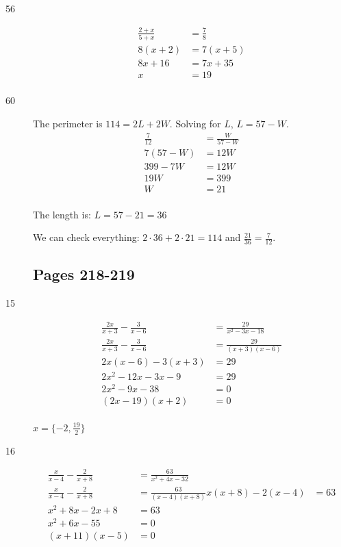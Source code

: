 \documentclass[fleqn,addpoints]{exam}
\begin{document}
\begin{description}
\item[56]
\begin{align*}
  \frac{2 + x}{5 + x} &= \frac{7}{8} \\
  8(x+2) &= 7(x+5) \\
  8x+16 &= 7x+35 \\
  x &= 19 \\
\end{align*}

\item[60]

The perimeter is $114 = 2L + 2W$.  Solving for $L$, $L = 57 - W$.
\begin{align*}
  \frac{7}{12} &= \frac{W}{57-W} \\
  7(57-W) &= 12W \\
  399 - 7W &= 12W \\
  19W &= 399 \\
  W &= 21 \\
\end{align*}

The length is: $L = 57 - 21 = 36$

We can check everything: $2 \cdot 36 + 2 \cdot 21 = 114$ and $\displaystyle \frac{21}{36} = \frac{7}{12}$.

\subsection{Pages 218-219}

\item[15]
\begin{align*}
  \frac{2x}{x+3} - \frac{3}{x-6} &= \frac{29}{x^2-3x-18} \\
  \frac{2x}{x+3} - \frac{3}{x-6} &= \frac{29}{(x+3)(x-6)} \\
  2x(x-6) - 3(x+3) &= 29 \\
  2x^2 - 12x - 3x - 9 &= 29 \\
  2x^2 -9x - 38 &= 0 \\
  (2x-19)(x+2) &= 0 \\
\end{align*}

\( \displaystyle x = \{ -2, \frac{19}{2} \} \)

\item[16]
\begin{align*}
  \frac{x}{x-4} - \frac{2}{x+8} &= \frac{63}{x^2+4x-32} \\
  \frac{x}{x-4} - \frac{2}{x+8} &= \frac{63}{(x-4)(x+8)}
  x(x+8) - 2(x-4) &= 63 \\
  x^2 + 8x - 2x + 8 &= 63 \\
  x^2 + 6x -55 &= 0 \\
  (x+11)(x-5) &= 0 \\
\end{align*}


\end{description}
\end{document}
